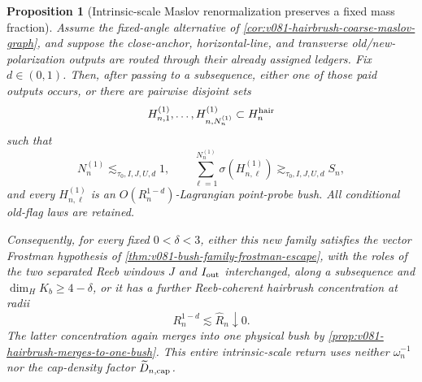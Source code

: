 \documentclass[10pt]{article}
\newtheorem{proposition}[theorem]{Proposition}
\begin{document}
\begin{proposition}[Intrinsic-scale Maslov renormalization preserves a fixed mass fraction]
\label{prop:v081-hairbrush-intrinsic-renormalization}
Assume the fixed-angle alternative of
\cref{cor:v081-hairbrush-coarse-maslov-graph}, and suppose the close-anchor, horizontal-line, and
transverse old/new-polarization outputs are routed through their already assigned ledgers.  Fix
\(d\in(0,1)\).  Then, after passing to a subsequence, either one of those paid outputs occurs, or
there are pairwise disjoint sets
\[
H^{(1)}_{n,1},\ldots,H^{(1)}_{n,N_n^{(1)}}
\subset H_n^{\rm hair}
\]
such that
\begin{equation}
\label{eq:v081-hairbrush-renormalized-family}
\boxed{
N_n^{(1)}\lesssim_{\tau_0,I,J,U,d}1,
\qquad
\sum_{\ell=1}^{N_n^{(1)}}\sigma(H^{(1)}_{n,\ell})
\gtrsim_{\tau_0,I,J,U,d}S_n,
}
\end{equation}
and every \(H^{(1)}_{n,\ell}\) is an
\(O(R_n^{1-d})\)-Lagrangian point-probe bush.  All conditional old-flag laws are retained.

Consequently, for every fixed \(0<\delta<3\), either this new family satisfies the vector
Frostman hypothesis of
\cref{thm:v081-bush-family-frostman-escape}, with the roles of the two separated Reeb windows
\(J\) and \(I_{\rm out}\) interchanged, along a subsequence and
\(\dim_HK_b\ge4-\delta\), or it has a further Reeb-coherent hairbrush concentration at radii
\[
R_n^{1-d}\lesssim \widehat R_n\downarrow0.
\]
The latter concentration again merges into one physical bush by
\cref{prop:v081-hairbrush-merges-to-one-bush}.  This entire intrinsic-scale return uses neither
\(\omega_n^{-1}\) nor the cap-density factor
\(\widetilde D_{n,\rm cap}\).
\end{proposition}
\end{document}
